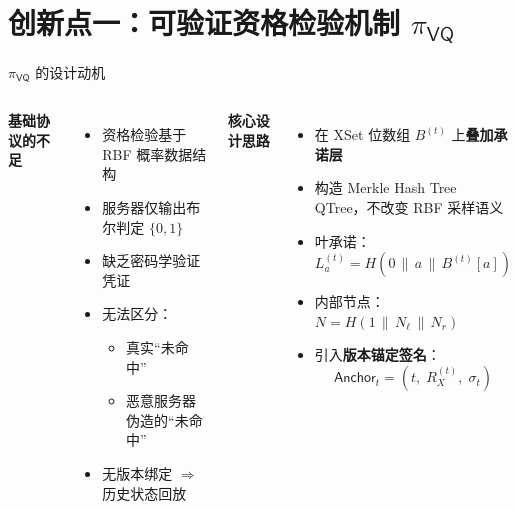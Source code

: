 \section{创新点一：可验证资格检验机制 $\pi_\mathsf{VQ}$}


\begin{frame}{$\pi_\mathsf{VQ}$ 的设计动机}

  \begin{columns}[T]
      \textbf{基础协议的不足}
      \begin{itemize}
        \item 资格检验基于 RBF 概率数据结构
        \item 服务器仅输出布尔判定 $\{0,1\}$
        \item 缺乏密码学验证凭证
        \item 无法区分：
          \begin{itemize}
            \item 真实``未命中''
            \item 恶意服务器伪造的``未命中''
          \end{itemize}
        \item 无版本绑定 $\Rightarrow$ 历史状态回放
      \end{itemize}

      \textbf{核心设计思路}
      \begin{itemize}
        \item 在 XSet 位数组 $B^{(t)}$ 上\textbf{叠加承诺层}
        \item 构造 Merkle Hash Tree QTree，不改变 RBF 采样语义
        \item 叶承诺：$L_a^{(t)} = H(0 \,\|\, a \,\|\, B^{(t)}[a])$
        \item 内部节点：$N = H(1 \,\|\, N_\ell \,\|\, N_r)$
        \item 引入\textbf{版本锚定签名}：
              \[\mathsf{Anchor}_t = (t,\; R_X^{(t)},\; \sigma_t)\]
      \end{itemize}
  \end{columns}

\end{frame}

